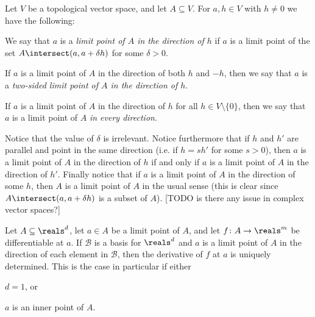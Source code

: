 \documentclass[article, a4paper, 11pt, oneside]{memoir}
\numberwithin{equation}{chapter}
\newcommand{\calB}{\mathcal{B}}
\begin{document}
\begin{definition}
    \label{def:directional-limit-points}
    Let $V$ be a topological vector space, and let $A \subseteq V$. For $a,h \in V$ with $h \neq 0$ we have the following:
    \begin{enumdef}
        \item We say that $a$ is a \emph{limit point of $A$ in the direction of $h$} if $a$ is a limit point of the set\footnotemark{} $A \intersect (a, a + \delta h)$ for some $\delta > 0$.

        \item If $a$ is a limit point of $A$ in the direction of both $h$ and $-h$, then we say that $a$ is a \emph{two-sided limit point of $A$ in the direction of $h$}.

        \item If $a$ is a limit point of $A$ in the direction of $h$ for all $h \in V \setminus \{0\}$, then we say that $a$ is a limit point of $A$ \emph{in every direction}.
    \end{enumdef}
\end{definition}
%
Notice that the value of $\delta$ is irrelevant. Notice furthermore that if $h$ and $h'$ are parallel and point in the same direction (i.e. if $h = sh'$ for some $s > 0$), then $a$ is a limit point of $A$ in the direction of $h$ if and only if $a$ is a limit point of $A$ in the direction of $h'$. Finally notice that if $a$ is a limit point of $A$ in the direction of some $h$, then $A$ is a limit point of $A$ in the usual sense (this is clear since $A \intersect (a, a + \delta h)$ is a subset of $A$). [TODO is there any issue in complex vector spaces?]

\begin{lemma}
    \label{lem:uniqueness-of-derivatives}
    Let $A \subseteq \reals^d$, let $a \in A$ be a limit point of $A$, and let $f \colon A \to \reals^m$ be differentiable at $a$. If $\calB$ is a basis for $\reals^d$ and $a$ is a limit point of $A$ in the direction of each element in $\calB$, then the derivative of $f$ at $a$ is uniquely determined. This is the case in particular if either
    \begin{enumlem}
        \item $d = 1$, or
        \item $a$ is an inner point of $A$.
    \end{enumlem}
\end{lemma}
\end{document}
